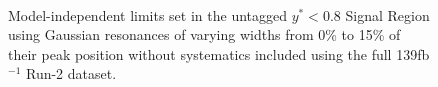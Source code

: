 \begin{figure}[!htb]
{            }\\
            \caption{Model-independent limits set in the untagged $y^{*} < 0.8$ Signal Region using Gaussian resonances of varying widths from 0\% to 15\% of their peak position without systematics included using the full 139fb$^{-1}$ Run-2 dataset.}
            \label{fig:SignalIndependentGaussianLimits_UntaggedYStar0p8}
        \end{figure}


